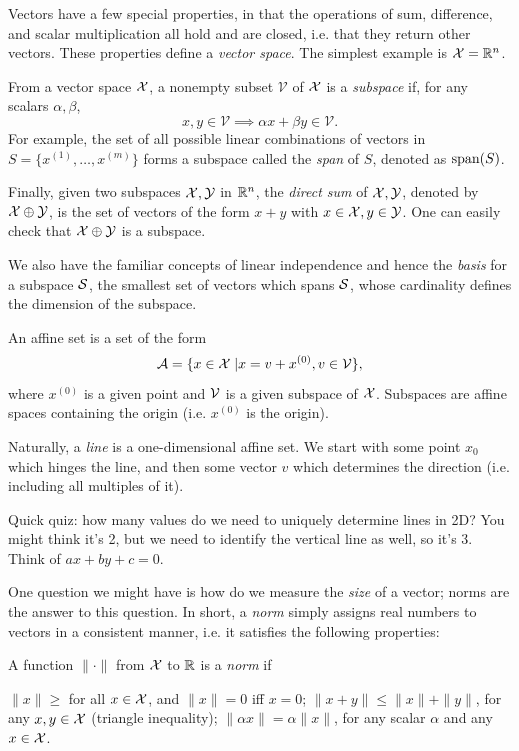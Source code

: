 \documentclass[11 pt]{scrartcl}
\begin{document}
Vectors have a few special properties, in that the operations of sum, difference, and scalar multiplication all hold and are closed, i.e. that they return other vectors. 
These properties define a \emph{vector space}. 
The simplest example is $\mathcal X = \mathbb R^n$. 

From a vector space $\mathcal X$, a nonempty subset $\mathcal{V}$ of $\mathcal X$ is a \emph{subspace} if, for any scalars $\alpha, \beta$, 
\[ x,y \in \mathcal{V} \implies \alpha x + \beta y \in \mathcal{V}.\] 
For example, the set of all possible linear combinations of vectors in $S = \{x^{(1)}, \dots, x^{(m)}\}$ forms a subspace called the \emph{span} of $S$, denoted as $\text{span}(S)$. 

Finally, given two subspaces $\mathcal X, \mathcal Y$ in $\mathbb R^n$, the \emph{direct sum} of $\mathcal X, \mathcal Y$, denoted by $\mathcal X\oplus \mathcal Y$, is the set of vectors of the form $x+y$ with $x\in \mathcal X, y\in \mathcal Y$. 
One can easily check that $\mathcal X\oplus\mathcal Y$ is a subspace. 

We also have the familiar concepts of linear independence and hence the \emph{basis} for a subspace $\mathcal S$, the smallest set of vectors which spans $\mathcal S$, whose cardinality defines the dimension of the subspace.

\begin{definition}
    An affine set is a set of the form 
    \[ \mathcal A = \{x\in \mathcal X\; | x = v+x^{(0)}, v\in \mathcal V\},\] 
    where $x^{(0)}$ is a given point and $\mathcal V$ is a given subspace of $\mathcal X$. 
    Subspaces are affine spaces containing the origin (i.e. $x^{(0)}$ is the origin). 
\end{definition}

Naturally, a \emph{line} is a one-dimensional affine set. 
We start with some point $x_0$ which hinges the line, and then some vector $v$ which determines the direction (i.e. including all multiples of it). 

Quick quiz: how many values do we need to uniquely determine lines in 2D? 
You might think it's 2, but we need to identify the vertical line as well, so it's 3. 
Think of $ax+by+c=0$. 

One question we might have is how do we measure the \emph{size} of a vector; norms are the answer to this question. 
In short, a \emph{norm} simply assigns real numbers to vectors in a consistent manner, i.e. it satisfies the following properties: 
\begin{definition}[Norm]
    A function $\|\cdot\|$ from $\mathcal X$ to $\mathbb R$ is a \emph{norm} if 
    \begin{enumerate}
        \ii $\|x\| \geq$ for all $x\in \mathcal X$, and $\|x\| = 0$ iff $x = 0$; 
        \ii $\|x+y\| \leq \|x\| + \|y\|$, for any $x,y\in \mathcal X$ (triangle inequality); 
        \ii $\|\alpha x\| = \alpha \|x\|$, for any scalar $\alpha$ and any $x\in \mathcal X$.
    \end{enumerate}
\end{definition}
\end{document}
